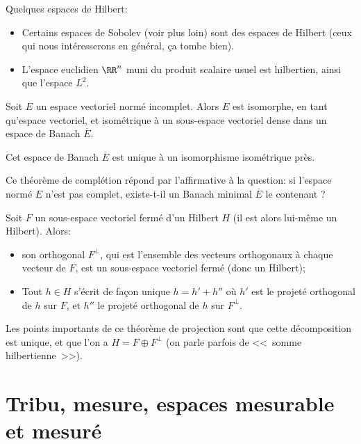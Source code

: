 \medskip
Quelques espaces de Hilbert:
\begin{itemize}
   \item Certains espaces de Sobolev (voir plus loin) sont des espaces de Hilbert (ceux qui nous intéresserons
en général, ça tombe bien).
   \item L'espace euclidien $\RR^n$ muni du produit scalaire
usuel est hilbertien, ainsi que l'espace $L^2$.
\end{itemize}


\begin{theoreme}\label{th:complbanach}
Soit $E$ un espace vectoriel normé incomplet.
Alors $E$ est isomorphe, en tant qu'espace vectoriel, et isométrique à un sous-espace
vectoriel dense dans un espace de Banach $\overline{E}$.

Cet espace de Banach $\overline{E}$ est unique à un isomorphisme isométrique près.
\end{theoreme}

Ce théorème de complétion répond par l'affirmative à la question:
si l'espace normé $E$ n'est pas complet, existe-t-il un Banach minimal $\overline{E}$ le
contenant ?

\begin{theoreme}\label{th:projHilbert}
Soit $F$ un sous-espace vectoriel fermé d'un Hilbert $H$ (il est alors lui-même un Hilbert).
Alors:
\begin{itemize}
   \item son orthogonal $F^\bot$, qui est l'ensemble des vecteurs orthogonaux à chaque
	vecteur de $F$, est un sous-espace vectoriel fermé (donc un Hilbert);
   \item Tout $h\in H$ s'écrit de façon unique $h=h'+h''$ où $h'$ est le projeté
	orthogonal de $h$ sur $F$, et $h''$ le projeté orthogonal de $h$ sur $F^\bot$.
\end{itemize}
\end{theoreme}

Les points importants de ce théorème de projection sont que cette décomposition est
unique, et que l'on a $H=F\oplus F^\bot$ (on parle parfois de <<~somme hilbertienne~>>).


\section{Tribu, mesure, espaces mesurable et mesuré}

